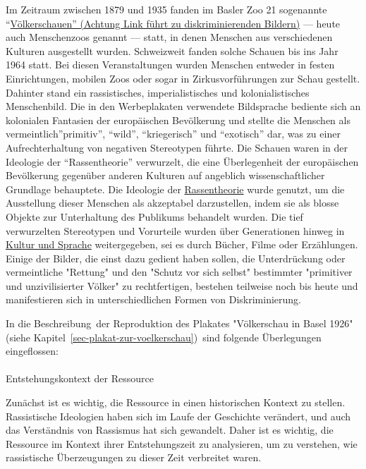 \documentclass[
  letterpaper,
  DIV=11,
  numbers=noendperiod]{scrartcl}
\makeatletter
\let\oldparagraph\paragraph
\renewcommand{\paragraph}{
    \@ifstar
      \xxxParagraphStar
      \xxxParagraphNoStar
  }
\newcommand{\xxxParagraphStar}[1]{\oldparagraph*{#1}\mbox{}}
\newcommand{\xxxParagraphNoStar}[1]{\oldparagraph{#1}\mbox{}}
\makeatother
\begin{document}
Im Zeitraum zwischen 1879 und 1935 fanden im Basler Zoo 21 sogenannte
``\href{https://www.baslerstadtbuch.ch/stadtbuch/1992/1992_2247.html}{Völkerschauen''
(Achtung Link führt zu diskriminierenden Bildern)} --- heute auch
Menschenzoos genannt --- statt, in denen Menschen aus verschiedenen
Kulturen ausgestellt wurden. Schweizweit fanden solche Schauen bis ins
Jahr 1964 statt. Bei diesen Veranstaltungen wurden Menschen entweder in
festen Einrichtungen, mobilen Zoos oder sogar in Zirkusvorführungen zur
Schau gestellt. Dahinter stand ein rassistisches, imperialistisches und
kolonialistisches Menschenbild. Die in den Werbeplakaten verwendete
Bildsprache bediente sich an kolonialen Fantasien der europäischen
Bevölkerung und stellte die Menschen als vermeintlich''primitiv'',
``wild'', ``kriegerisch'' und ``exotisch'' dar, was zu einer
Aufrechterhaltung von negativen Stereotypen führte. Die Schauen waren in
der Ideologie der ``Rassentheorie'' verwurzelt, die eine Überlegenheit
der europäischen Bevölkerung gegenüber anderen Kulturen auf angeblich
wissenschaftlicher Grundlage behauptete. Die Ideologie der
\href{https://hls-dhs-dss.ch/de/articles/060537/2024-04-08/}{Rassentheorie}
wurde genutzt, um die Ausstellung dieser Menschen als akzeptabel
darzustellen, indem sie als blosse Objekte zur Unterhaltung des
Publikums behandelt wurden. Die tief verwurzelten Stereotypen und
Vorurteile wurden über Generationen hinweg in
\href{https://mirsindvoda.ch/voelkerschauen-in-der-schweiz/}{Kultur und
Sprache} weitergegeben, sei es durch Bücher, Filme oder Erzählungen.
Einige der Bilder, die einst dazu gedient haben sollen, die
Unterdrückung oder vermeintliche "Rettung" und den "Schutz vor sich
selbst" bestimmter "primitiver und unzivilisierter Völker" zu
rechtfertigen, bestehen teilweise noch bis heute und manifestieren sich
in unterschiedlichen Formen von Diskriminierung.

In die Beschreibung~der Reproduktion des Plakates "Völkerschau in Basel
1926" (siehe Kapitel~\ref{sec-plakat-zur-voelkerschau})~sind folgende
Überlegungen eingeflossen:

\paragraph{Entstehungskontext der
Ressource}\label{entstehungskontext-der-ressource}

Zunächst ist es wichtig, die Ressource in einen historischen Kontext zu
stellen. Rassistische Ideologien haben sich im Laufe der Geschichte
verändert, und auch das Verständnis von Rassismus hat sich gewandelt.
Daher ist es wichtig, die Ressource im Kontext ihrer Entstehungszeit zu
analysieren, um zu verstehen, wie rassistische Überzeugungen zu dieser
Zeit verbreitet waren.
\end{document}
